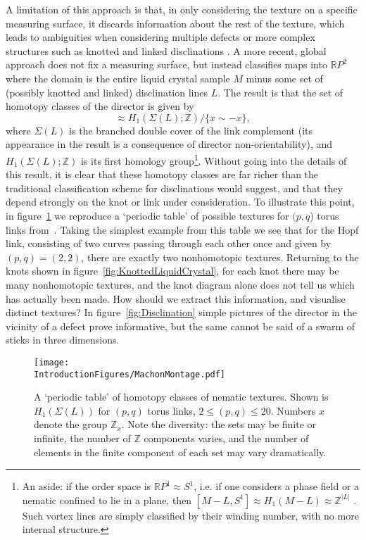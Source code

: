 A limitation of this approach is that, in only considering the texture on a specific measuring surface, it discards information about the rest of the texture, which leads to ambiguities when considering multiple defects or more complex structures such as knotted and linked disclinations \citep{Alexander2012,Machon2014,Machon2016,MachonThesis}. A more recent, global approach \citep{Machon2014,Machon2016,MachonThesis} does not fix a measuring surface, but instead classifies maps into $\mathbb{R}P^2$ where the domain is the entire liquid crystal sample $M$ minus some set of (possibly knotted and linked) disclination lines $L$. The result is that the set of homotopy classes of the director is given by
\begin{equation}
[M-L, \mathbb{R}P^2] \approx H_1(\Sigma(L); \mathbb{Z})/\{ x \sim -x\},
\label{eq:HomotopyClassification}
\end{equation}
where $\Sigma(L)$ is the branched double cover of the link complement (its appearance in the result is a consequence of director non-orientability), and $H_1(\Sigma(L); \mathbb{Z})$ is its first homology group\footnote{An aside: if the order space is $ \mathbb{R}P^1 \approx S^1$, i.e. if one considers a phase field or a nematic confined to lie in a plane, then $[M-L, S^1] \approx H_1(M-L) \approx \mathbb{Z}^{|L|}$ \citep{Lickorish1997}. Such vortex lines are simply classified by their winding number, with no more internal structure.}. Without going into the details of this result, it is clear that these homotopy classes are far richer than the traditional classification scheme for disclinations would suggest, and that they depend strongly on the knot or link under consideration. To illustrate this point, in figure~\ref{fig:MachonMontage} we reproduce a `periodic table' of possible textures for $(p,q$) torus links from~\citep{MachonThesis}. Taking the simplest example from this table we see that for the Hopf link, consisting of two curves passing through each other once and given by $(p,q)=(2,2)$, there are exactly two nonhomotopic textures. Returning to the knots shown in figure~\ref{fig:KnottedLiquidCrystal}, for each knot there may be many nonhomotopic textures, and the knot diagram alone does not tell us which has actually been made. How should we extract this information, and visualise distinct textures? In figure~\ref{fig:Disclination} simple pictures of the director in the vicinity of a defect prove informative, but the same cannot be said of a swarm of sticks in three dimensions.
\begin{figure}[htbp]
\centering
\texttt{[image: \\IntroductionFigures/MachonMontage.pdf]}
    \caption[A periodic table of homotopy classes.]{A `periodic table' of homotopy classes of nematic textures. Shown is $H_1(\Sigma(L))$ for $(p,q)$ torus links, $2\leq (p,q) \leq 20$. Numbers $x$ denote the group $\mathbb{Z}_x$. Note the diversity: the sets may be finite or infinite, the number of $\mathbb{Z}$ components varies, and the number of elements in the finite component of each set may vary dramatically.}
\label{fig:MachonMontage}
\end{figure}

